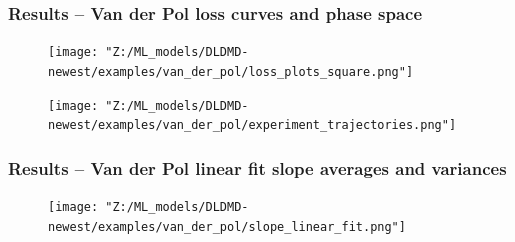 \documentclass[11pt,aspectratio=169]{beamer}
\begin{document}
    \begin{frame}
        \frametitle{Results -- Van der Pol loss curves and phase space}
        \begin{figure}
            \centering
            \begin{minipage}{.5\textwidth}
                \texttt{[image: "Z:/ML\_models/DLDMD-newest/examples/van\_der\_pol/loss\_plots\_square.png"]}
            \end{minipage}%
            \begin{minipage}{.5\textwidth}
                \texttt{[image: "Z:/ML\_models/DLDMD-newest/examples/van\_der\_pol/experiment\_trajectories.png"]}
            \end{minipage}
        \end{figure}
    \end{frame}

    \begin{frame}
        \frametitle{Results -- Van der Pol linear fit slope averages and variances}
        
        \begin{figure}
            \centering
            \texttt{[image: "Z:/ML\_models/DLDMD-newest/examples/van\_der\_pol/slope\_linear\_fit.png"]}
        \end{figure}
    \end{frame}
\end{document}
